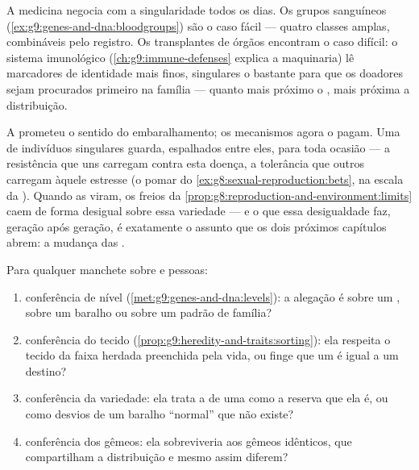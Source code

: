 \begin{example}\label{ex:g9:unique-individuals:medicine}
A medicina negocia com a singularidade todos os dias. Os
grupos sanguíneos (\cref{ex:g9:genes-and-dna:bloodgroups})
são o caso fácil --- quatro classes amplas, combináveis pelo
registro. Os transplantes de órgãos encontram o caso difícil:
o sistema imunológico (\cref{ch:g9:immune-defenses} explica a
maquinaria) lê marcadores de identidade mais finos,
singulares o bastante para que os doadores sejam procurados
primeiro na família --- quanto mais próximo o ,
mais próxima a distribuição.
\end{example}

\begin{proposition}\label{prop:g9:unique-individuals:reserve}
A  prometeu o
sentido do embaralhamento; os mecanismos agora o pagam. Uma
 de indivíduos singulares guarda, espalhados entre
eles,  para toda ocasião --- a resistência que uns
carregam contra esta doença, a tolerância que outros carregam
àquele estresse (o pomar do
\cref{ex:g8:sexual-reproduction:bets}, na escala da ).
Quando as  viram, os freios da
\cref{prop:g8:reproduction-and-environment:limits} caem de
forma desigual sobre essa variedade --- e o que essa
desigualdade faz, geração após geração, é exatamente o
assunto que os dois próximos capítulos abrem: a mudança das
.
\end{proposition}
\admitted

\begin{method}\label{met:g9:unique-individuals:claims}
Para qualquer manchete sobre  e pessoas:
\begin{enumerate}
  \item conferência de nível
        (\cref{met:g9:genes-and-dna:levels}): a alegação é
        sobre um , sobre um baralho ou sobre um padrão de
        família?
  \item conferência do tecido
        (\cref{prop:g9:heredity-and-traits:sorting}): ela
        respeita o tecido da faixa herdada preenchida pela
        vida, ou finge que um  é igual a um destino?
  \item conferência da variedade: ela trata a  de
        uma  como a reserva que ela é, ou como
        desvios de um baralho ``normal'' que não existe?
  \item conferência dos gêmeos: ela sobreviveria aos gêmeos
        idênticos, que compartilham a distribuição e mesmo
        assim diferem?
\end{enumerate}
\end{method}

